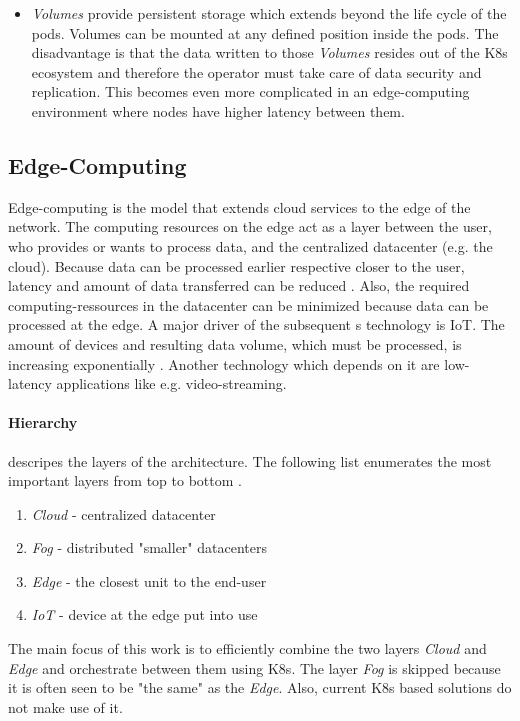 \documentclass[MSC,Master,english]{twbook}%
\begin{document}
\begin{itemize}
    \item \textit{Volumes} provide persistent storage which extends beyond the life cycle of the pods. Volumes can be mounted at any defined position inside the pods. The disadvantage is that the data written to those \textit{Volumes} resides out of the \ac{K8s} ecosystem and therefore the operator must take care of data security and replication. This becomes even more complicated in an edge-computing environment where nodes have higher latency between them.
\end{itemize}

\subsection{Edge-Computing}
Edge-computing is the model that extends cloud services to the edge of the
network. The computing resources on the edge act as a layer between the user, who provides or wants to process data, and the centralized datacenter (e.g. the cloud). Because data can be processed earlier respective closer to the user, latency and amount of data transferred can be reduced \cite{intro-edge}. Also, the required computing-ressources in the datacenter can be minimized because data can be processed at the edge. A major driver of the subsequent s technology is \ac{IoT}. The amount of devices and resulting data volume, which must be processed, is increasing exponentially \cite{SotE21}. Another technology which depends on it are low-latency applications like e.g. video-streaming. 

\paragraph{Hierarchy} descripes the layers of the architecture. The following list enumerates the most important layers from top to bottom \cite{intro-edge}.
\begin{enumerate}
    \item \textit{Cloud} - centralized datacenter
    \item \textit{Fog} - distributed "smaller" datacenters
    \item \textit{Edge} - the closest unit to the end-user
    \item \textit{\ac{IoT}} - device at the edge put into use
\end{enumerate}


The main focus of this work is to efficiently combine the two layers \textit{Cloud} and \textit{Edge} and orchestrate between them using \ac{K8s}. The layer \textit{Fog} is skipped because it is often seen to be "the same" as the \textit{Edge}. Also, current \ac{K8s} based solutions do not make use of it. 
\end{document}
